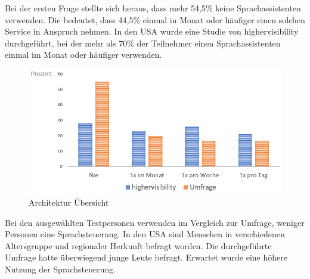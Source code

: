 Bei der ersten Frage stellte sich heraus, dass mehr 54,5\% keine Sprachassistenten verwenden. Die bedeutet, dass 44,5\% einmal in Monat oder häufiger einen solchen Service in Anspruch nehmen. In den USA wurde eine Studie von highervisibility durchgeführt, bei der mehr als 70\% der Teilnehmer einen Sprachassistenten einmal im Monat oder häufiger verwenden\cite{highervisibility}.

\begin{figure}[h!]
	\centering
	\includegraphics[width=0.7\linewidth]{Picture/umfrage_haeufigkeit}
	\caption[Architektur Übersicht]{Architektur Übersicht}
	\label{fig:umfrage_haeufigkeit}
\end{figure}

Bei den ausgewählten Testpersonen verwenden im Vergleich zur Umfrage, weniger Personen eine Sprachsteuerung. In den USA sind Menschen in verschiedenen Altersgruppe und regionaler Herkunft befragt worden. Die durchgeführte Umfrage hatte überwiegend junge Leute befragt. Erwartet wurde eine höhere Nutzung der Sprachsteuerung. 


